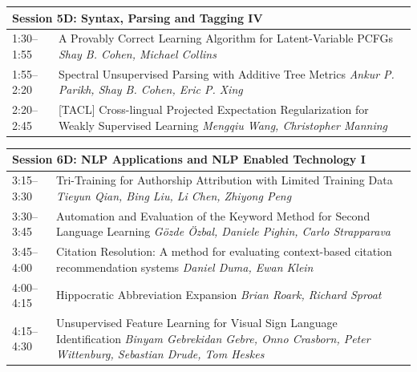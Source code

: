 \documentclass{book}
\renewcommand{\large}{\fontsize{36}{40}\selectfont}
\begin{document}
\begin{tabular}{p{3in}p{16in}}
  \multicolumn{2}{l}{\bfseries\large Session 5D: Syntax, Parsing and Tagging IV} \\\hline

    
    1:30--1:55
    &	A Provably Correct Learning Algorithm for Latent-Variable PCFGs \newline 
    {\itshape Shay B. Cohen, Michael Collins} \\
    
    1:55--2:20
    &	Spectral Unsupervised Parsing with Additive Tree Metrics \newline 
    {\itshape Ankur P. Parikh, Shay B. Cohen, Eric P. Xing} \\
    
    2:20--2:45
    &	[TACL] Cross-lingual Projected Expectation Regularization for Weakly Supervised Learning \newline 
    {\itshape Mengqiu Wang, Christopher Manning} \\
    
\end{tabular}

\begin{tabular}{p{3in}p{16in}}
  \multicolumn{2}{l}{\bfseries\large Session 6D: NLP Applications and NLP Enabled Technology I} \\\hline

    
    3:15--3:30
    &	Tri-Training for Authorship Attribution with Limited Training Data \newline 
    {\itshape Tieyun Qian, Bing Liu, Li Chen, Zhiyong Peng} \\
    
    3:30--3:45
    &	Automation and Evaluation of the Keyword Method for Second Language Learning \newline 
    {\itshape Gözde Özbal, Daniele Pighin, Carlo Strapparava} \\
    
    3:45--4:00
    &	Citation Resolution: A method for evaluating context-based citation recommendation systems \newline 
    {\itshape Daniel Duma, Ewan Klein} \\
    
    4:00--4:15
    &	Hippocratic Abbreviation Expansion \newline 
    {\itshape Brian Roark, Richard Sproat} \\
    
    4:15--4:30
    &	Unsupervised Feature Learning for Visual Sign Language Identification \newline 
    {\itshape Binyam Gebrekidan Gebre, Onno Crasborn, Peter Wittenburg, Sebastian Drude, Tom Heskes} \\
    
\end{tabular}
\end{document}
